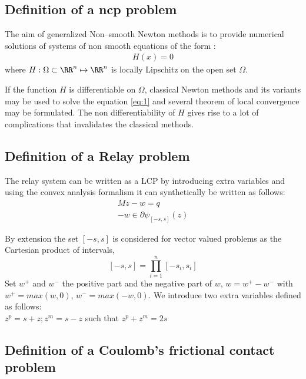 \subsection{Definition of a \acs{ncp} problem}
The aim of generalized Non--smooth Newton methods is to provide numerical solutions of systems of non smooth equations of the form :
\begin{eqnarray}
  \label{eq:1}
  H(x)=0
\end{eqnarray}
where $H:\Omega \subset \RR^n \mapsto \RR^n $ is locally Lipschitz on the open set $\Omega$. 

If the function $H$ is differentiable on $\Omega$, classical Newton  methods and its variants may be used to solve the equation \eqref{eq:1} and several theorem of local convergence may be formulated. The non differentiability of $H$ gives rise to a lot of complications that invalidates the classical methods.

\subsection{Definition of a Relay problem}

The relay system can be written as a LCP by introducing extra variables and using the convex analysis formalism it can synthetically be written as follows:
\begin{eqnarray}
Mz-w=q\label{relequi}\\
-w \in \partial\psi_{[-s,s]}(z)\label{relcomp} 
\end{eqnarray}

By extension the set $[-s,s]$ is considered for vector valued problems as the Cartesian product of intervals,\\
$$ [-s,s]=\prod_{i=1}^{n}[-s_{i},s_{i}]$$
Set $w^+$ and $w^-$ the positive part and the negative part of $w$, $w=w^+-w^-$ with $w^+=max(w,0)$, $w^-=max(-w,0)$. We introduce two extra variables defined as follows:\\
$z^{p}=s+z ; z^{m}=s-z $ such that $z^{p}+z^{m}=2s$\\

\subsection{Definition of a Coulomb's frictional contact problem}


